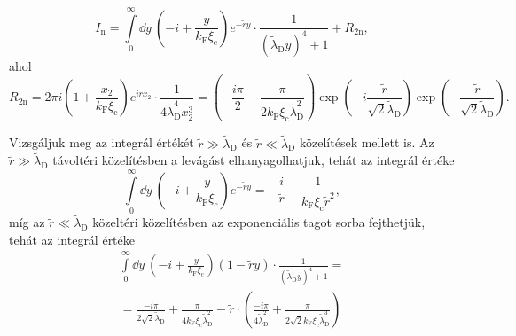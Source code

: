 \documentclass[a4paper,12pt,titlepage]{article}
\newcommand{\kF}{{k_\text{F}}}
\begin{document}
\begin{equation}
	I_\text{n} = \int\limits_0^\infty \dd{y} ~ \left( -i + \frac{y}{\kF \xi_\text{c}} \right) e^{-\tilde{r} y} \cdot \frac{1}{\left( \tilde{\lambda}_\text{D} y \right)^4 + 1} + R_{2 \text{n}},
\end{equation}
ahol
\begin{equation}
	R_{2 \text{n}} = 2 \pi i \left( 1 + \frac{x_2}{\kF \xi_\text{c}} \right) e^{i \tilde{r} x_2} \cdot \frac{1}{4 \tilde{\lambda}_\text{D}^4 x_2^3} = \left( -\frac{i \pi}{2} - \frac{\pi}{2 \kF \xi_\text{c} \tilde{\lambda}_\text{D}^2} \right) \exp(-i \frac{\tilde{r}}{\sqrt{2} \tilde{\lambda}_\text{D}}) \exp(-\frac{\tilde{r}}{\sqrt{2} \tilde{\lambda}_\text{D}}).
\end{equation}

Vizsgáljuk meg az integrál értékét $\tilde{r} \gg \tilde{\lambda}_\text{D}$ és $\tilde{r} \ll \tilde{\lambda}_\text{D}$ közelítések mellett is.  Az $\tilde{r} \gg \tilde{\lambda}_\text{D}$ távoltéri közelítésben a levágást elhanyagolhatjuk, tehát az integrál értéke
\begin{equation} \label{g-n-far-field}
	\int\limits_0^\infty \dd{y} ~ \left( -i + \frac{y}{\kF \xi_\text{c}} \right) e^{-\tilde{r} y} = -\frac{i}{\tilde{r}} + \frac{1}{\kF \xi_\text{c} \tilde{r}^2},
\end{equation}
míg az $\tilde{r} \ll \tilde{\lambda}_\text{D}$ közeltéri közelítésben az exponenciális tagot sorba fejthetjük, tehát az integrál értéke
\begin{multline} \label{g-n-near-field}
	\int\limits_0^\infty \dd{y} ~ \left( -i + \frac{y}{\kF \xi_\text{c}} \right) \left( 1 - \tilde{r} y \right) \cdot \frac{1}{\left( \tilde{\lambda}_\text{D} y \right)^4 + 1} = \\
	= \frac{-i \pi}{2 \sqrt{2} \tilde{\lambda}_\text{D}} + \frac{\pi}{4 \kF \xi_\text{c} \tilde{\lambda}_\text{D}^2} - \tilde{r} \cdot \left( \frac{-i \pi}{4 \tilde{\lambda}_\text{D}^2} + \frac{\pi}{2 \sqrt{2} \kF \xi_\text{c} \tilde{\lambda}_\text{D}^3} \right)
\end{multline}
\end{document}
